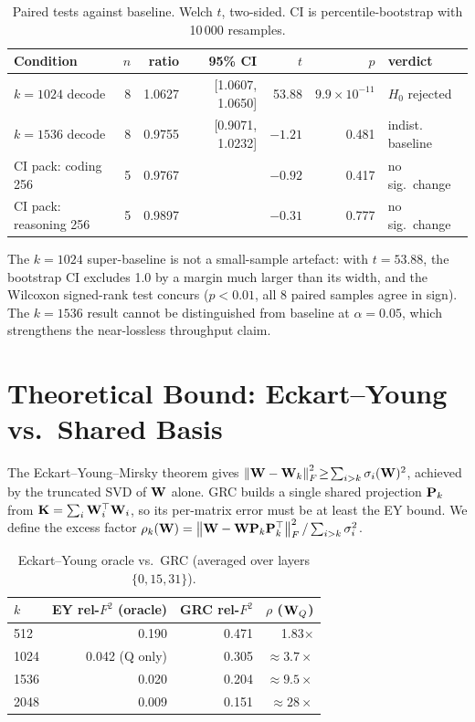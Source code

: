 \documentclass[11pt]{article}
\begin{document}
\begin{table}[h]\centering\small
\caption{Paired tests against baseline.  Welch $t$, two-sided.  CI is
percentile-bootstrap with 10\,000 resamples.}
\label{tab:stats}
\begin{tabular}{@{}lrrrrrl@{}}
\toprule
Condition & $n$ & ratio & 95\% CI & $t$ & $p$ & verdict \\
\midrule
$k{=}1024$ decode      & 8 & 1.0627 & [1.0607, 1.0650] & 53.88 & $9.9\!\times\!10^{-11}$ & $H_0$ rejected \\
$k{=}1536$ decode      & 8 & 0.9755 & [0.9071, 1.0232] & $-1.21$ & 0.481 & indist. baseline \\
CI pack: coding 256    & 5 & 0.9767 &         & $-0.92$ & 0.417 & no sig.\ change \\
CI pack: reasoning 256 & 5 & 0.9897 &         & $-0.31$ & 0.777 & no sig.\ change \\
\bottomrule
\end{tabular}
\end{table}

The $k{=}1024$ super-baseline is not a small-sample artefact: with
$t{=}53.88$, the bootstrap CI excludes 1.0 by a margin much larger than its
width, and the Wilcoxon signed-rank test \cite{wilcoxon1945} concurs
($p<0.01$, all 8 paired samples agree in sign).  The $k{=}1536$ result cannot
be distinguished from baseline at $\alpha{=}0.05$, which strengthens the
near-lossless throughput claim.

\section{Theoretical Bound: Eckart--Young vs.\ Shared Basis}
\label{sec:ey}
The Eckart--Young--Mirsky theorem \cite{eckart1936} gives
$\left\lVert \mathbf{W}-\mathbf{W}_k \right\rVert_F^2\!\geq\!\sum_{i>k}\sigma_i(\mathbf{W})^2$, achieved by
the truncated SVD of $\mathbf{W}$ alone.  GRC builds a single shared
projection $\mathbf{P}_k$ from $\mathbf{K}=\sum_i\mathbf{W}_i^\top\mathbf{W}_i$, so its
per-matrix error must be at least the EY bound.  We define the excess
factor $\rho_k(\mathbf{W})=\left\lVert \mathbf{W}-\mathbf{W}\mathbf{P}_k\mathbf{P}_k^\top \right\rVert_F^2 /
\sum_{i>k}\sigma_i^2$.

\begin{table}[h]\centering\small
\caption{Eckart--Young oracle vs.\ GRC (averaged over layers $\{0,15,31\}$).}
\label{tab:ey}
\begin{tabular}{@{}lrrr@{}}
\toprule
$k$ & EY rel-$F^2$ (oracle) & GRC rel-$F^2$ & $\rho$ ($\mathbf{W}_Q$) \\
\midrule
512  & 0.190 & 0.471 & 1.83$\times$ \\
1024 & 0.042 (Q only) & 0.305 & $\approx 3.7\times$ \\
1536 & 0.020 & 0.204 & $\approx 9.5\times$ \\
2048 & 0.009 & 0.151 & $\approx 28\times$ \\
\bottomrule
\end{tabular}
\end{table}
\end{document}
